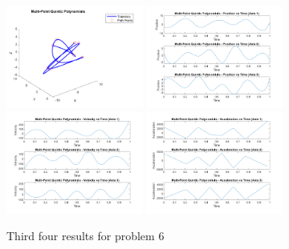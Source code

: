 \documentclass[conference]{IEEEtran}
\begin{document}
\begin{figure}[htbp]
    \centering
    \includegraphics[width=0.4\textwidth]{figures/prob6/fig_9.png}
    \includegraphics[width=0.4\textwidth]{figures/prob6/fig_10.png}
    \includegraphics[width=0.4\textwidth]{figures/prob6/fig_11.png}
    \includegraphics[width=0.4\textwidth]{figures/prob6/fig_12.png}
    \caption{Third four results for problem 6}
    \label{fig:res9}
\end{figure}
\end{document}
